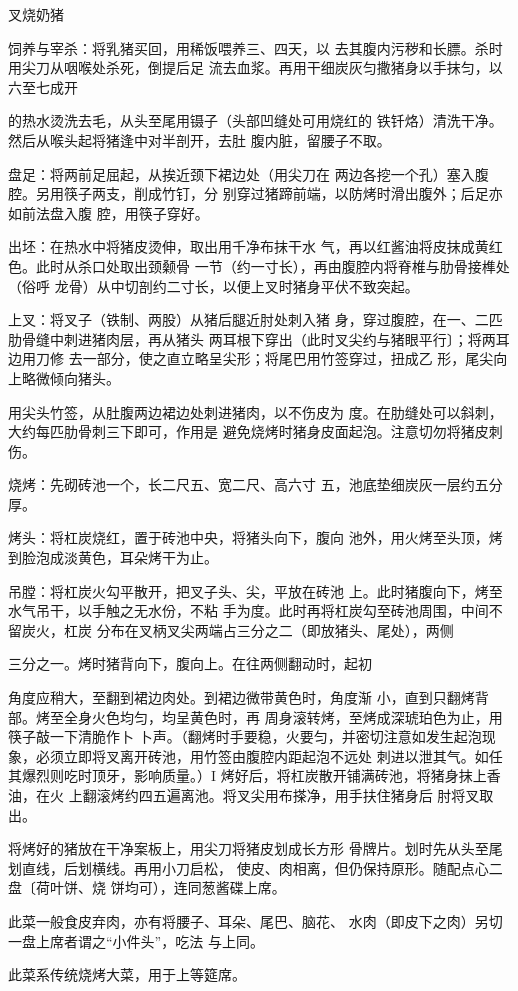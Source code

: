 \begin{recipe}{叉烧奶猪}

\ingredients


\cooking

\step 饲养与宰杀：将乳猪买回，用稀饭喂养三、四天，以 去其腹内污秽和长膘。杀时用尖刀从咽喉处杀死，倒提后足 流去血浆。再用干细炭灰匀撒猪身以手抹匀，以六至七成开

的热水烫洗去毛，从头至尾用镊子（头部凹缝处可用烧红的 铁钎烙）清洗干净。然后从喉头起将猪逢中对半剖开，去肚 腹内脏，留腰子不取。

\step 盘足：将两前足屈起，从挨近颈下裙边处（用尖刀在 两边各挖一个孔）塞入腹腔。另用筷子两支，削成竹钉，分 别穿过猪蹄前端，以防烤时滑出腹外；后足亦如前法盘入腹 腔，用筷子穿好。

\step 出坯：在热水中将猪皮烫伸，取出用千净布抹干水 气，再以红酱油将皮抹成黄红色。此时从杀口处取出颈颡骨 一节（约一寸长），再由腹腔内将脊椎与肋骨接榫处（俗呼 龙骨）从中切剖约二寸长，以便上叉时猪身平伏不致突起。

上叉：将叉子（铁制、两股）从猪后腿近肘处刺入猪 身，穿过腹腔，在一、二匹肋骨缝中刺进猪肉层，再从猪头 两耳根下穿出（此时叉尖约与猪眼平行〕；将两耳边用刀修 去一部分，使之直立略呈尖形；将尾巴用竹签穿过，扭成乙 形，尾尖向上略微倾向猪头。

用尖头竹签，从肚腹两边裙边处刺进猪肉，以不伤皮为 度。在肋缝处可以斜刺，大约每匹肋骨刺三下即可，作用是 避免烧烤时猪身皮面起泡。注意切勿将猪皮刺伤。

\step 烧烤：先砌砖池一个，长二尺五、宽二尺、高六寸 五，池底垫细炭灰一层约五分厚。

\step 烤头：将杠炭烧红，置于砖池中央，将猪头向下，腹向 池外，用火烤至头顶，烤到脸泡成淡黄色，耳朵烤干为止。

\step 吊膛：将杠炭火勾平散开，把叉子头、尖，平放在砖池 上。此时猪腹向下，烤至水气吊干，以手触之无水份，不粘 手为度。此时再将杠炭勾至砖池周围，中间不留炭火，杠炭 分布在叉柄叉尖两端占三分之二（即放猪头、尾处），两侧

三分之一。烤时猪背向下，腹向上。在往两侧翻动时，起初

角度应稍大，至翻到裙边肉处。到裙边微带黄色时，角度渐 小，直到只翻烤背部。烤至全身火色均匀，均呈黄色时，再 周身滚转烤，至烤成深琥珀色为止，用筷子敲一下清脆作卜 卜声。（翻烤时手要稳，火要匀，并密切注意如发生起泡现 象，必须立即将叉离开砖池，用竹签由腹腔内距起泡不远处 刺进以泄其气。如任其爆烈则吃时顶牙，影响质量。）I 烤好后，将杠炭散开铺满砖池，将猪身抹上香油，在火 上翻滚烤约四五遍离池。将叉尖用布搽净，用手扶住猪身后 肘将叉取出。

将烤好的猪放在干净案板上，用尖刀将猪皮划成长方形 骨牌片。划时先从头至尾划直线，后划横线。再用小刀启松， 使皮、肉相离，但仍保持原形。随配点心二盘〔荷叶饼、烧 饼均可），连同葱酱碟上席。

此菜一般食皮弃肉，亦有将腰子、耳朵、尾巴、脑花、 水肉（即皮下之肉）另切一盘上席者谓之“小件头”，吃法 与上同。

\notes

此菜系传统烧烤大菜，用于上等筵席。

\end{recipe}

